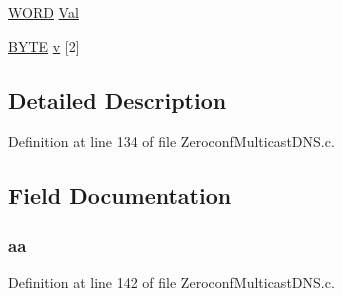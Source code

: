\begin{DoxyCompactItemize}
\begin{tabbing}
\end{tabbing}\item 
\hyperlink{_generic_type_defs_8h_a2b0e863dadf920709ec53d9088ee7c91}{W\+O\+R\+D} \hyperlink{union___m_d_n_s___m_s_g___h_e_a_d_e_r___f_l_a_g_s_aa498550e7f87da9a38dc71609652e6bd}{Val}
\item 
\hyperlink{_generic_type_defs_8h_a4ae1dab0fb4b072a66584546209e7d58}{B\+Y\+T\+E} \hyperlink{union___m_d_n_s___m_s_g___h_e_a_d_e_r___f_l_a_g_s_a7fdb4efd25bea3061432cd8967c7bd30}{v} \mbox{[}2\mbox{]}
\end{DoxyCompactItemize}


\subsection{Detailed Description}


Definition at line 134 of file Zeroconf\+Multicast\+D\+N\+S.\+c.



\subsection{Field Documentation}
\hypertarget{union___m_d_n_s___m_s_g___h_e_a_d_e_r___f_l_a_g_s_afbb4ddf62c29332fa116d202b3717104}{}
\subsubsection[{aa}]{ aa}\label{union___m_d_n_s___m_s_g___h_e_a_d_e_r___f_l_a_g_s_afbb4ddf62c29332fa116d202b3717104}


Definition at line 142 of file Zeroconf\+Multicast\+D\+N\+S.\+c.

\hypertarget{union___m_d_n_s___m_s_g___h_e_a_d_e_r___f_l_a_g_s_a10591b5d6e002c08a658907ccb7a420d}{}
